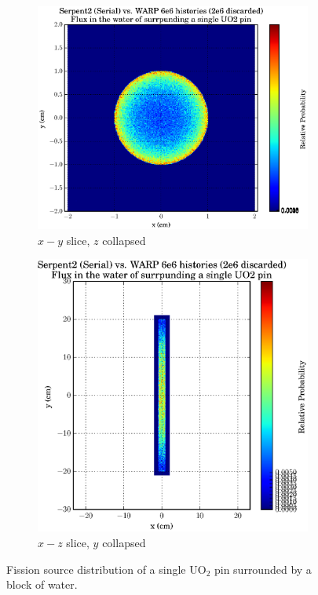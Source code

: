 \begin{figure}[h!]
\centering
\begin{subfigure}{.5\textwidth}
  \centering
  \includegraphics[width=\linewidth]{graphics/finalresults/pincell_fiss1.eps}
  \caption{$x-y$ slice, $z$ collapsed}
  \label{fig:sub1}
\end{subfigure}%
\begin{subfigure}{.5\textwidth}
  \centering
  \includegraphics[width=\linewidth]{graphics/finalresults/pincell_fiss2.eps}
  \caption{$x-z$ slice, $y$ collapsed}
  \label{fig:sub2}
\end{subfigure}
\caption{Fission source distribution of a single UO$_2$ pin surrounded by a block of water. \label{pincell_fiss} }
\end{figure}

